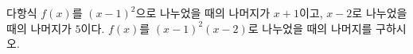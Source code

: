 다항식 $f(x)$를 $(x-1)^2$으로 나누었을 때의 나머지가 $x+1$이고, $x-2$로 나누었을 때의 나머지가 $5$이다. $f(x)$를 $(x-1)^2(x-2)$로 나누었을 때의 나머지를 구하시오.
